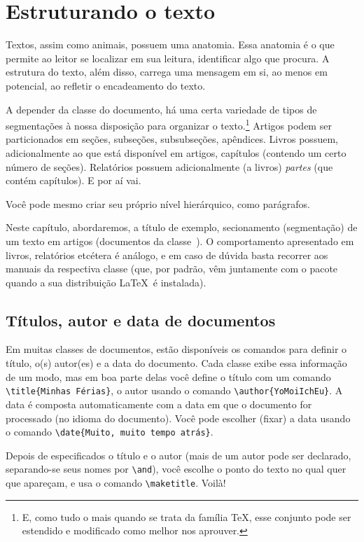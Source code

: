 \section{Estruturando o texto}

Textos, assim como animais, possuem uma anatomia. Essa anatomia é o que permite ao leitor se localizar em sua leitura, identificar algo que procura. A estrutura do texto, além disso, carrega uma mensagem em si, ao menos em potencial, ao refletir o encadeamento do texto.

A depender da classe do documento, há uma certa variedade de tipos de segmentações à nossa disposição para organizar o texto.\footnote{E, como tudo o mais quando se trata da família \TeX, esse conjunto pode ser estendido e modificado como melhor nos aprouver.}
Artigos podem ser particionados em seções, subseções, subsubseções, apêndices.
Livros possuem, adicionalmente ao que está disponível em artigos, capítulos (contendo um certo número de seções).
Relatórios possuem adicionalmente (a livros) \emph{partes} (que contém capítulos).
E por aí vai.

Você pode mesmo criar seu próprio nível hierárquico, como parágrafos.%

Neste capítulo, abordaremos, a título de exemplo, secionamento (segmentação) de um texto em artigos (documentos da classe~). O comportamento apresentado em livros, relatórios etcétera é análogo, e em caso de dúvida basta recorrer aos manuais da respectiva classe (que, por padrão, vêm juntamente com o pacote quando a sua distribuição \LaTeX\ é instalada).

\subsection{Títulos, autor e data de documentos}

Em muitas classes de documentos, estão disponíveis os comandos para
definir o título, o(s) autor(es) e a data do documento. Cada classe
exibe essa informação de um modo, mas em boa parte delas você define o
título com um comando \verb'\title{Minhas Férias}', o autor usando o
comando \verb'\author{YoMoiIchEu}'. A data é composta automaticamente
com a data em que o documento for processado (no idioma do
documento). Você pode escolher (fixar) a data usando o comando
\verb'\date{Muito, muito tempo atrás}'.

Depois de especificados o título e o autor (mais de um autor pode ser
declarado, separando-se seus nomes por \verb'\and'), você escolhe o
ponto do texto no qual quer que apareçam, e usa o comando
\verb'\maketitle'. Voilà!

